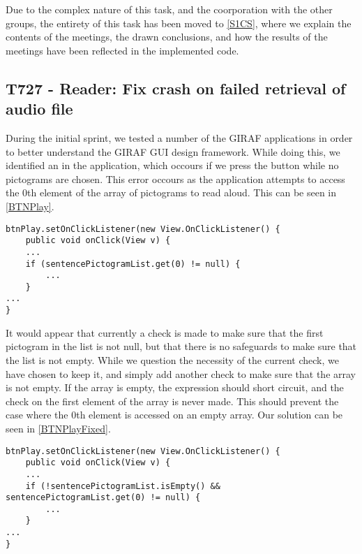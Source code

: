 Due to the complex nature of this task, and the coorporation with the other
groups, the entirety of this task has been moved to \autoref{S1CS}, where we
explain the contents of the meetings, the drawn conclusions, and how the results
of the meetings have been reflected in the implemented code.


\subsection{T727 - Reader: Fix crash on failed retrieval of audio file}
\label{T727}
During the initial sprint, we tested a number of the GIRAF
applications in order to better understand the GIRAF GUI design framework. While doing this, we
identified an  in the 
application, which occours if we press the  button while no
pictograms are chosen. This error occours as the application attempts to access
the 0th element of the array of pictograms to read aloud. This can be seen in
\autoref{BTNPlay}.\nl

\begin{minipage}[H]{\linewidth}
\begin{lstlisting}[caption = Accessing the 0th element of a null array., label = BTNPlay] 
btnPlay.setOnClickListener(new View.OnClickListener() {
	public void onClick(View v) {
	...
	if (sentencePictogramList.get(0) != null) {
		...
	}
...
}
\end{lstlisting}
\end{minipage}

It would appear that currently a check is made to make sure that the first
pictogram in the list is not null, but that there is no safeguards to make sure
that the list is not empty. While we question the necessity of the current
check, we have chosen to keep it, and simply add another check to make sure that
the array is not empty. If the array is empty, the expression should short
circuit, and the check on the first element of the array is never made. This
should prevent the case where the 0th element is accessed on an empty array. Our
solution can be seen in \autoref{BTNPlayFixed}.\nl

\begin{minipage}[H]{\linewidth}
\begin{lstlisting}[caption = Our solution to the presented problem., label = BTNPlayFixed] 
btnPlay.setOnClickListener(new View.OnClickListener() {
	public void onClick(View v) {
	...
	if (!sentencePictogramList.isEmpty() && sentencePictogramList.get(0) != null) {
		...
	}
...
}
\end{lstlisting}
\end{minipage}

